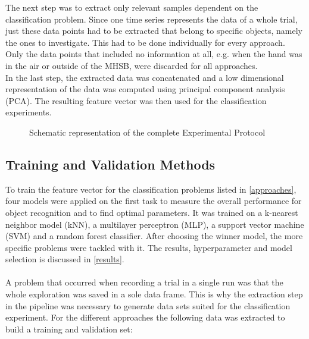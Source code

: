 The next step was to extract only relevant samples dependent on the classification problem. Since one time series represents the data of a whole trial, just these data points had to be extracted that belong to specific objects, namely the ones to investigate. This had to be done individually for every approach. Only the data points that included no information at all, e.g. when the hand was in the air or outside of the MHSB, were discarded for all approaches. \\
In the last step, the extracted data was concatenated and a low dimensional representation of the data was computed using principal component analysis (PCA). The resulting feature vector was then used for the classification experiments. 

\begin{figure}[h]
	\caption{Schematic representation of the complete Experimental Protocol}
	\label{pipeline}
\end{figure}

\subsection{Training and Validation Methods}
To train the feature vector for the classification problems listed in \ref{approaches}, four models were applied on the first task to measure the overall performance for object recognition and to find optimal parameters. It was trained on a k-nearest neighbor model (kNN), a multilayer perceptron (MLP), a support vector machine (SVM) and a random forest classifier. After choosing the winner model, the more specific problems were tackled with it. The results, hyperparameter and model selection is discussed in \ref{results}.\\
\\
A problem that occurred when recording a trial in a single run was that the whole exploration was saved in a sole data frame. This is why the extraction step in the pipeline was necessary to generate data sets suited for the classification experiment. For the different approaches the following data was extracted to build a training and validation set:

